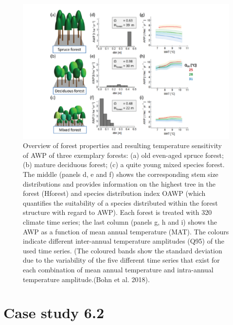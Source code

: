 \documentclass[
  12pt,
  oneside]{book}
\begin{document}
\begin{figure}

{\centering \includegraphics[width=0.8\linewidth]{figures/chap6/f636_bohn2} 

}

\caption{Overview of forest properties and resulting temperature sensitivity of AWP of three exemplary forests: (a) old even-aged spruce forest; (b) mature deciduous forest; (c) a quite young mixed species forest. The middle (panels d, e and f) shows the corresponding stem size distributions and provides information on the highest tree in the forest (Hforest) and species distribution index OAWP (which quantifies the suitability of a species distributed within the forest structure with regard to AWP). Each forest is treated with 320 climate time series; the last column (panels g, h and i) shows the AWP as a function of mean annual temperature (MAT). The colours indicate different inter-annual temperature amplitudes (Q95) of the used time series. (The coloured bands show the standard deviation due to the variability of the five different time series that exist for each combination of mean annual temperature and intra-annual temperature amplitude.(Bohn et al. 2018).}\label{fig:f636}
\end{figure}

\hypertarget{case-study-6.2}{%
\section{Case study 6.2}\label{case-study-6.2}}
\end{document}

